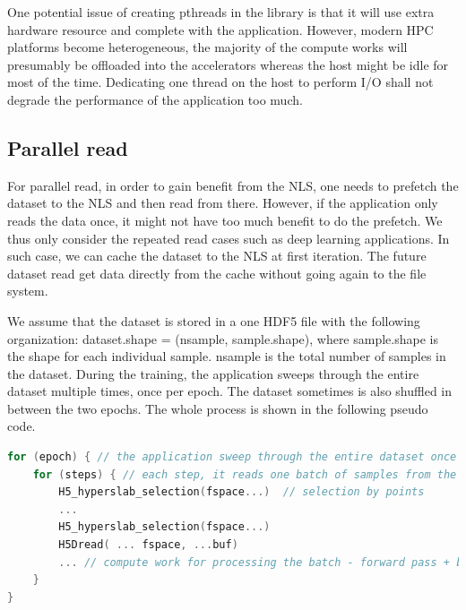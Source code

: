 \documentclass[aps, prb, 11pt, notitlepage]{revtex4-1}
\begin{document}
One potential issue of creating pthreads in the library is that it will use extra hardware resource and complete with the application. However, modern HPC platforms become heterogeneous, the majority of the compute works will presumably be offloaded into the accelerators whereas the host might be idle for most of the time. Dedicating one thread on the host to perform I/O shall not degrade the performance of the application too much. 

\subsection{Parallel read}
For parallel read, in order to gain benefit from the NLS, one needs to prefetch the dataset to the NLS and then read from there. However, if the application only reads the data once, it might not have too much benefit to do the prefetch. We thus only consider the repeated read cases such as deep learning applications. In such case, we can cache the dataset to the NLS at first iteration. The future dataset read get data directly from the cache without going again to the file system. 

We assume that the dataset is stored in a one HDF5 file with the following organization: dataset.shape = (nsample, sample.shape), where sample.shape is the shape for each individual sample. {nsample} is the total number of samples in the dataset. During the training, the application sweeps through the entire dataset multiple times, once per epoch. The dataset sometimes is also shuffled in between the two epochs. The whole process is shown in the following pseudo code. 
\begin{lstlisting}[language=c]
for (epoch) { // the application sweep through the entire dataset once per epoch
	for (steps) { // each step, it reads one batch of samples from the dataset. 
		H5_hyperslab_selection(fspace...)  // selection by points 
		...
		H5_hyperslab_selection(fspace...)
		H5Dread( ... fspace, ...buf)
		... // compute work for processing the batch - forward pass + backward pass ... 
	}
}
\end{lstlisting}
\end{document}
